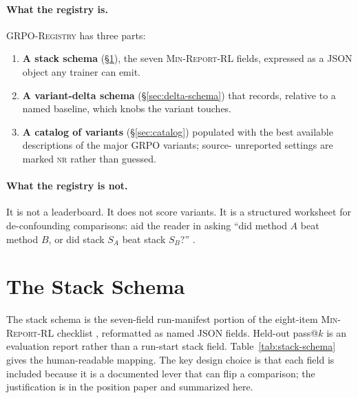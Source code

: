 \documentclass[11pt]{article}
\newcommand{\nr}{\textsc{nr}}
\newcommand{\minreport}{\textsc{Min-Report-RL}}
\newcommand{\grpo}{\textsc{GRPO}}
\newcommand{\grpoReg}{\textsc{GRPO-Registry}}
\begin{document}
\paragraph{What the registry is.} \grpoReg{} has three parts:
\begin{enumerate}[leftmargin=1.6em, itemsep=2pt]
  \item \textbf{A stack schema} (\S\ref{sec:stack-schema}), the seven
    \minreport{} fields, expressed as a JSON object any trainer can emit.
  \item \textbf{A variant-delta schema} (\S\ref{sec:delta-schema}) that
    records, relative to a named baseline, which knobs the variant touches.
  \item \textbf{A catalog of variants} (\S\ref{sec:catalog}) populated with
    the best available descriptions of the major \grpo{} variants; source-
    unreported settings are marked \nr{} rather than guessed.
\end{enumerate}

\paragraph{What the registry is not.} It is not a leaderboard. It does not
score variants. It is a structured worksheet for de-confounding comparisons:
aid the reader in asking ``did method $A$ beat method $B$, or did stack $S_A$
beat stack $S_B$?'' \cite{zvfaudit2026}.

\section{The Stack Schema}
\label{sec:stack-schema}

The stack schema is the seven-field run-manifest portion of the eight-item
\minreport{} checklist \cite{minreportrl2026}, reformatted as named JSON fields.
Held-out pass@$k$ is an evaluation report rather than a run-start stack field.
Table~\ref{tab:stack-schema} gives the
human-readable mapping. The key design choice is that each field is included
because it is a documented lever that can flip a comparison; the justification
is in the position paper and summarized here.
\end{document}
